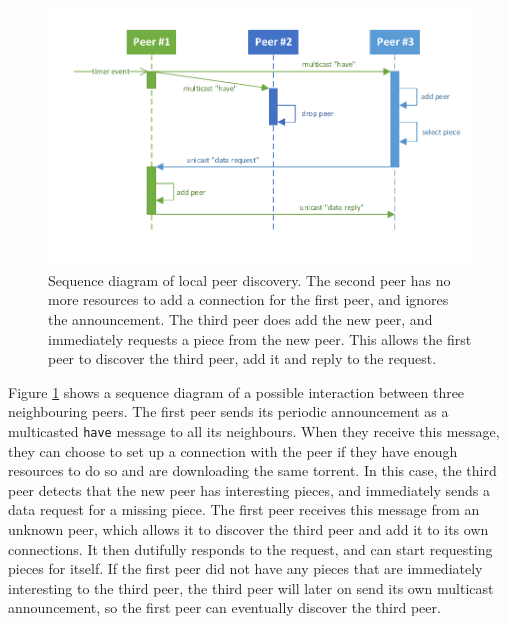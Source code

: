 \begin{figure}
    \centering
    \includegraphics[width=\textwidth]{diagrams/local-peer-discovery.pdf}
    \caption[Sequence diagram of local peer discovery]{Sequence diagram of local peer discovery. The second peer has no more resources to add a connection for the first peer, and ignores the announcement. The third peer does add the new peer, and immediately requests a piece from the new peer. This allows the first peer to discover the third peer, add it and reply to the request.}
    \label{fig:discovery:local}
\end{figure}

Figure \ref{fig:discovery:local} shows a sequence diagram of a possible interaction between three neighbouring peers. The first peer sends its periodic announcement as a multicasted \texttt{have} message to all its neighbours. When they receive this message, they can choose to set up a connection with the peer if they have enough resources to do so and are downloading the same torrent. In this case, the third peer detects that the new peer has interesting pieces, and immediately sends a data request for a missing piece. The first peer receives this message from an unknown peer, which allows it to discover the third peer and add it to its own connections. It then dutifully responds to the request, and can start requesting pieces for itself. If the first peer did not have any pieces that are immediately interesting to the third peer, the third peer will later on send its own multicast announcement, so the first peer can eventually discover the third peer.


